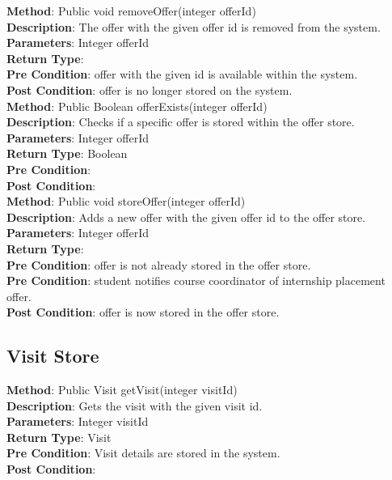 \documentclass{l3deliverable}
\begin{document}
\textbf{Method}: Public void removeOffer(integer offerId)\\
\textbf{Description}: The offer with the given offer id is removed from the system. \\
\textbf{Parameters}: Integer offerId \\
\textbf{Return Type}:\\
\textbf{Pre Condition}: offer with the given id is available within the system.\\
\textbf{Post Condition}: offer is no longer stored on the system.\\

\textbf{Method}: Public Boolean offerExists(integer offerId) \\
\textbf{Description}: Checks if a specific offer is stored within the offer store. \\
\textbf{Parameters}: Integer offerId\\
\textbf{Return Type}: Boolean\\
\textbf{Pre Condition}:\\
\textbf{Post Condition}:\\

\textbf{Method}: Public void storeOffer(integer offerId)\\
\textbf{Description}: Adds a new offer with the given offer id to the offer store. \\
\textbf{Parameters}: Integer offerId\\
\textbf{Return Type}:\\
\textbf{Pre Condition}: offer is not already stored in the offer store.\\
\textbf{Pre Condition}: student notifies course coordinator of internship placement offer.\\
\textbf{Post Condition}: offer is now stored in the offer store.\\

\subsection{Visit Store}

\textbf{Method}: Public Visit getVisit(integer visitId)\\
\textbf{Description}: Gets the visit with the given visit id. \\
\textbf{Parameters}: Integer visitId\\
\textbf{Return Type}: Visit\\
\textbf{Pre Condition}: Visit details are stored in the system.\\
\textbf{Post Condition}:\\
\end{document}

